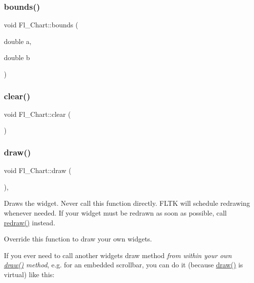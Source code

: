 \subsubsection{\texorpdfstring{bounds()}{bounds()}\hspace{0.1cm}{\footnotesize\ttfamily [2/2]}}
{\footnotesize\ttfamily void Fl\+\_\+\+Chart\+::bounds (\begin{DoxyParamCaption}\item[{double}]{a,  }\item[{double}]{b }\end{DoxyParamCaption})}

\mbox{\label{class_fl___chart_a4779938d0d2fe72349f1f40e34cccbbe}} 
\subsubsection{\texorpdfstring{clear()}{clear()}}
{\footnotesize\ttfamily void Fl\+\_\+\+Chart\+::clear (\begin{DoxyParamCaption}{ }\end{DoxyParamCaption})}

\mbox{\label{class_fl___chart_a72ec7a85128f8fcac3a306cc90afc876}} 
\subsubsection{\texorpdfstring{draw()}{draw()}}
{\footnotesize\ttfamily void Fl\+\_\+\+Chart\+::draw (\begin{DoxyParamCaption}{ }\end{DoxyParamCaption})\hspace{0.3cm}{\ttfamily [protected]}, {\ttfamily [virtual]}}

Draws the widget. Never call this function directly. F\+L\+TK will schedule redrawing whenever needed. If your widget must be redrawn as soon as possible, call \hyperlink{class_fl___widget_aa63ce68cbf4620cf8750b868368ea02b}{redraw()} instead.

Override this function to draw your own widgets.

If you ever need to call another widget\textquotesingle{}s draw method {\itshape from within your own \hyperlink{class_fl___chart_a72ec7a85128f8fcac3a306cc90afc876}{draw()} method}, e.\+g. for an embedded scrollbar, you can do it (because \hyperlink{class_fl___chart_a72ec7a85128f8fcac3a306cc90afc876}{draw()} is virtual) like this\+:


